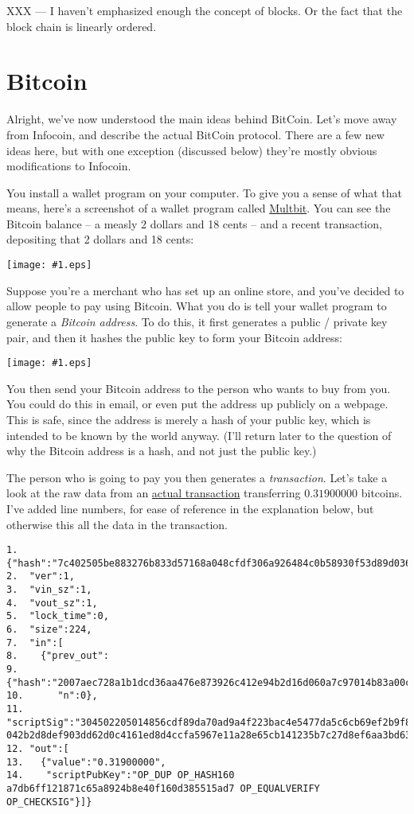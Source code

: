 \documentclass[12pt]{book}
\newcommand{\img}[2]{\begin{center}\texttt{[image: \#1.eps]}\end{center}}
\newcommand{\link}[2]{\href{#1}{#2}}
\begin{document}
XXX --- I haven't emphasized enough the concept of blocks.  Or the
fact that the block chain is linearly ordered.

\section{Bitcoin}

Alright, we've now understood the main ideas behind BitCoin.  Let's
move away from Infocoin, and describe the actual BitCoin protocol.
There are a few new ideas here, but with one exception (discussed
below) they're mostly obvious modifications to Infocoin.

You install a wallet program on your computer.  To give you a sense of
what that means, here's a screenshot of a wallet program called
\link{https://multibit.org/}{Multbit}.  You can see the Bitcoin
balance -- a measly 2 dollars and 18 cents -- and a recent
transaction, depositing that 2 dollars and 18 cents:
% 
\img{images/wallet_transaction}{400px}
%
Suppose you're a merchant who has set up an online store, and you've
decided to allow people to pay using Bitcoin.  What you do is tell
your wallet program to generate a \emph{Bitcoin address}.  To do this,
it first generates a public / private key pair, and then it hashes the
public key to form your Bitcoin address:
%
\img{images/bitcoin_address}{400px}
%
You then send your Bitcoin address to the person who wants to buy from
you.  You could do this in email, or even put the address up publicly
on a webpage.  This is safe, since the address is merely a hash of
your public key, which is intended to be known by the world anyway.
(I'll return later to the question of why the Bitcoin address is a
hash, and not just the public key.)

The person who is going to pay you then generates a
\emph{transaction}.  Let's take a look at the raw data from an
\link{http://blockexplorer.com/tx/7c402505be883276b833d57168a048cfdf306a926484c0b58930f53d89d036f9}{actual
  transaction} transferring $0.31900000$ bitcoins.  I've added line
numbers, for ease of reference in the explanation below, but otherwise
this all the data in the transaction.
\begin{Verbatim}[fontsize=\small]
1.  {"hash":"7c402505be883276b833d57168a048cfdf306a926484c0b58930f53d89d036f9",
2.  "ver":1,
3.  "vin_sz":1,
4.  "vout_sz":1,
5.  "lock_time":0,
6.  "size":224,
7.  "in":[
8.    {"prev_out":
9.      {"hash":"2007aec728a1b1dcd36aa476e873926c412e94b2d16d060a7c97014b83a00c3e",
10.      "n":0},
11.    "scriptSig":"304502205014856cdf89da70ad9a4f223bac4e5477da5c6cb69ef2b9f8b5f8548e21307e0221009bfe2698f1eb1c561f41981d8e78c11d9e685a70e682f144ee6c8ab5ecb0497c01 042b2d8def903dd62d0c4161ed8d4ccfa5967e11a28e65cb141235b7c27d8ef6aa3bd63be077323cf3d7e0e8895b264b94feb4b40478b431da6f45dfc8e1004f62"}],
12. "out":[
13.   {"value":"0.31900000",
14.    "scriptPubKey":"OP_DUP OP_HASH160 a7db6ff121871c65a8924b8e40f160d385515ad7 OP_EQUALVERIFY OP_CHECKSIG"}]}
\end{Verbatim}
\end{document}
